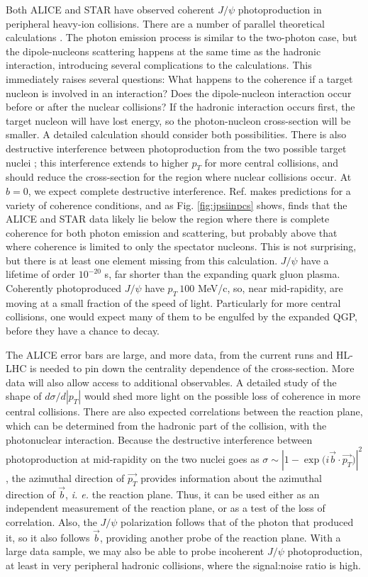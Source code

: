 \documentclass[../report.tex]{subfiles}
\begin{document}
Both ALICE \cite{Adam:2015gba}  and STAR \cite{Zha:2018ohg} have observed coherent $J/\psi$ photoproduction in peripheral heavy-ion collisions.  There are a number of parallel theoretical calculations \cite{Klusek-Gawenda:2015hja,Zha:2017jch}.  The photon emission process is similar to the two-photon case, but the dipole-nucleons scattering happens at the same time as the hadronic interaction, introducing several complications to the calculations.  This immediately raises several questions:  What happens to the coherence if a target nucleon is involved in an interaction?   Does the dipole-nucleon interaction occur before or after the nuclear collisions?    If the hadronic interaction occurs first, the target nucleon will have lost energy, so the photon-nucleon cross-section will be smaller.  A detailed calculation should consider both possibilities.   There is also destructive interference between photoproduction from the two possible target nuclei \cite{Abelev:2008ew}; this interference extends to higher $p_T$ for more central collisions, and should reduce the cross-section for the region where nuclear collisions occur. At $b=0$, we expect complete destructive interference.  Ref. \cite{Zha:2017jch} makes predictions for a variety of coherence conditions, and as Fig. \ref{fig:jpsiinpcs} shows, finds that the ALICE and STAR data likely lie below the region where there is complete coherence for both photon emission and scattering, but probably above that where coherence is limited to only the spectator nucleons.  This is not surprising, but there is at least one element missing from this calculation.  $J/\psi$ have a lifetime of order $10^{-20}$ s, far shorter than the expanding quark gluon plasma.  Coherently photoproduced $J/\psi$ have $p_T ~ 100$ MeV/c, so, near mid-rapidity,  are moving at a small fraction of the speed of light.  Particularly for more central collisions, one would expect many of them to be engulfed by the expanded QGP, before they have a chance to decay.  

The ALICE error bars are large, and more data, from the current runs and HL-LHC is needed to pin down the centrality dependence of the cross-section.  More data will also allow access to additional observables.  A detailed study of the shape of $d\sigma/d|p_T|$ would shed more light on the possible loss of coherence in more central collisions. There are also expected correlations between the reaction plane, which can be determined from the hadronic part of the collision, with the photonuclear interaction.  Because the destructive interference between photoproduction at mid-rapidity on the two nuclei goes as $\sigma \sim |1-\exp{(i{\vec{b}\cdot\vec{p_T})}}|^2$ \cite{Klein:1999gv}, the azimuthal direction of $\vec{p_T}$ provides information about the azimuthal direction of $\vec{b}$, {\it i. e.} the reaction plane.  Thus, it can be used either as an independent measurement of the reaction plane, or as a test of the loss of correlation.  Also, the $J/\psi$ polarization follows that of the photon that produced it, so it also follows $\vec{b}$, providing another probe of the reaction plane.  With a large data sample, we may also be able to probe incoherent $J/\psi$ photoproduction, at least in very peripheral hadronic collisions, where the signal:noise ratio is high.  
\end{document}
